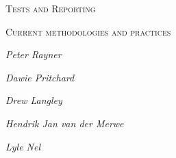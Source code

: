 \documentclass{article}
\begin{document}
\begin{titlepage}
	\centering
	\vfill
	{\scshape\LARGE Tests and Reporting\par}
	\vfill
	{\scshape\Large Current methodologies and practices\par}
	\vfill
	\bigskip
    {\itshape\Large Peter Rayner\par}
    {\itshape\Large Dawie Pritchard\par}
    {\itshape\Large Drew Langley\par}
    {\itshape\Large Hendrik Jan van der Merwe\par}
    {\itshape\Large Lyle Nel\par}
	\vfill
\end{titlepage}


\clearpage
\tableofcontents



\end{document}
